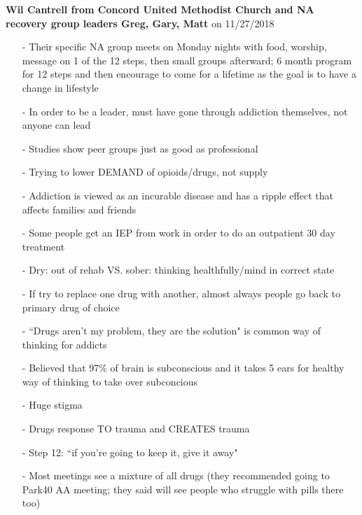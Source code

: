\documentclass[12pt]{article}
\begin{document}
\textbf{Wil Cantrell from Concord United Methodist Church and NA recovery group leaders Greg, Gary, Matt} on 11/27/2018 \\

\begin{itemize}
\item[-] Their specific NA group meets on Monday nights with food, worship, message on 1 of the 12 steps, then small groups afterward; 6 month program for 12 steps and then encourage to come for a lifetime as the goal is to have a change in lifestyle
\item[-] In order to be a leader, must have gone through addiction themselves, not anyone can lead
\item[-] Studies show peer groups just as good as professional
\item[-] Trying to lower DEMAND of opioids/drugs, not supply
\item[-] Addiction is viewed as an incurable disease and has a ripple effect that affects families and friends 
\item[-] Some people get an IEP from work in order to do an outpatient 30 day treatment
\item[-] Dry: out of rehab VS. sober: thinking healthfully/mind in correct state 
\item[-] If try to replace one drug with another, almost always people go back to primary drug of choice
\item[-] ``Drugs aren't my problem, they are the solution" is common way of thinking for addicts 
\item[-] Believed that 97\% of brain is subconscious and it takes 5 ears for healthy way of thinking to take over subconcious 
\item[-] Huge stigma
\item[-] Drugs response TO trauma and CREATES trauma
\item[-] Step 12: ``if you're going to keep it, give it away"
\item[-] Most meetings see a mixture of all drugs (they recommended going to Park40 AA meeting; they said will see people who struggle with pills there too)
\end{itemize}
\end{document}
